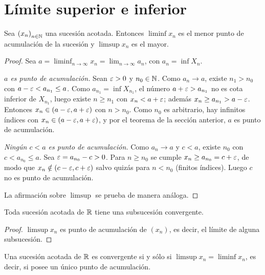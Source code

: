 \section{Límite superior e inferior}

\begin{theorem}
  Sea \({(x_n)}_{n \in \mathbb{N}}\) una sucesión acotada. Entonces \(\liminf x_n\) es el menor punto de acumulación de la sucesión y \(\limsup x_n\) es el mayor.
\end{theorem}

\begin{proof}
  Sea \(a = \liminf_{n \to \infty} x_n = \lim_{n \to \infty} a_n\), con \(a_n = \inf X_n\).

  \emph{\(a\) es punto de acumulación.} Sean \(\varepsilon > 0\) y \(n_0 \in \mathbb{N}\). Como \(a_n \to a\), existe \(n_1 > n_0\) con \(a - \varepsilon < a_{n_1} \leq a\). Como \(a_{n_1} = \inf X_{n_1}\), el número \(a + \varepsilon > a_{n_1}\) no es cota inferior de \(X_{n_1}\), luego existe \(n \geq n_1\) con \(x_n < a + \varepsilon\); además \(x_n \geq a_{n_1} > a - \varepsilon\). Entonces \(x_n \in (a - \varepsilon, a + \varepsilon)\) con \(n > n_0\). Como \(n_0\) es arbitrario, hay infinitos índices con \(x_n \in (a - \varepsilon, a + \varepsilon)\), y por el teorema de la sección anterior, \(a\) es punto de acumulación.

  \emph{Ningún \(c < a\) es punto de acumulación.} Como \(a_n \to a\) y \(c < a\), existe \(n_0\) con \(c < a_{n_0} \leq a\). Sea \(\varepsilon = a_{n_0} - c > 0\). Para \(n \geq n_0\) se cumple \(x_n \geq a_{n_0} = c + \varepsilon\), de modo que \(x_n \notin (c - \varepsilon, c + \varepsilon)\) salvo quizás para \(n < n_0\) (finitos índices). Luego \(c\) no es punto de acumulación.

  La afirmación sobre \(\limsup\) se prueba de manera análoga.
\end{proof}

\begin{theorem}
  Toda sucesión acotada de \(\mathbb{R}\) tiene una subsucesión convergente.
\end{theorem}

\begin{proof}
  \(\limsup x_n\) es punto de acumulación de \({(x_n)}\), es decir, el límite de alguna subsucesión.
\end{proof}

\begin{corollary}
  Una sucesión acotada de \(\mathbb{R}\) es convergente si y sólo si \(\limsup x_n = \liminf x_n\), es decir, si posee un único punto de acumulación.
\end{corollary}

